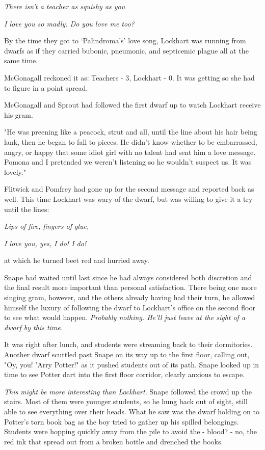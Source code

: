 \documentclass[a4paper,11pt]{article}
\begin{document}
\emph{There isn't a teacher as squishy as you}

\emph{I love you so madly. Do you love me too?}

By the time they got to `Palindroma's' love song, Lockhart was running from dwarfs as if they carried bubonic, pneumonic, and septicemic plague all at the same time.

McGonagall reckoned it as: Teachers - 3, Lockhart - 0. It was getting so she had to figure in a point spread.

McGonagall and Sprout had followed the first dwarf up to watch Lockhart receive his gram.

"He was preening like a peacock, strut and all, until the line about his hair being lank, then he began to fall to pieces. He didn't know whether to be embarrassed, angry, or happy that some idiot girl with no talent had sent him a love message. Pomona and I pretended we weren't listening so he wouldn't suspect us. It was lovely."

Flitwick and Pomfrey had gone up for the second message and reported back as well. This time Lockhart was wary of the dwarf, but was willing to give it a try until the lines:

\emph{Lips of fire, fingers of glue,}

\emph{I love you, yes, I do! I do!}

at which he turned beet red and hurried away.

Snape had waited until last since he had always considered both discretion and the final result more important than personal satisfaction. There being one more singing gram, however, and the others already having had their turn, he allowed himself the luxury of following the dwarf to Lockhart's office on the second floor to see what would happen. \emph{Probably nothing. He'll just leave at the sight of a dwarf by this time.}

It was right after lunch, and students were streaming back to their dormitories. Another dwarf scuttled past Snape on its way up to the first floor, calling out, "Oy, you! 'Arry Potter!" as it pushed students out of its path. Snape looked up in time to see Potter dart into the first floor corridor, clearly anxious to escape.

\emph{This might be more interesting than Lockhart.} Snape followed the crowd up the stairs. Most of them were younger students, so he hung back out of sight, still able to see everything over their heads. What he saw was the dwarf holding on to Potter's torn book bag as the boy tried to gather up his spilled belongings. Students were hopping quickly away from the pile to avoid the - blood? - no, the red ink that spread out from a broken bottle and drenched the books.
\end{document}
